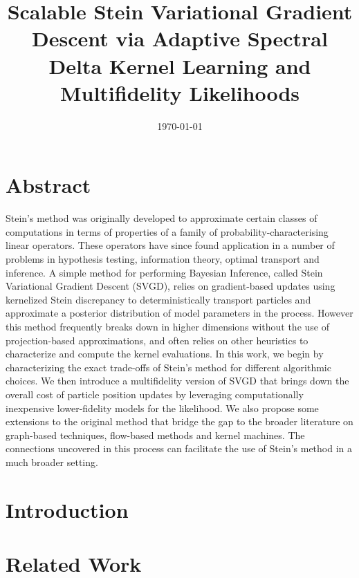 \documentclass[12pt]{article}
\title{Scalable Stein Variational Gradient Descent via Adaptive Spectral Delta Kernel Learning and Multifidelity Likelihoods}
\date{\today}
\renewcommand{\[}{\left[}
\renewcommand{\]}{\right]}
\renewcommand{\(}{\left(}
\renewcommand{\)}{\right)}
\begin{document}
\maketitle
\section*{Abstract}
Stein's method was originally developed to approximate certain classes of computations in terms of properties of a family of probability-characterising linear operators. 
These operators have since found application in a number of problems in hypothesis testing, information theory, optimal transport and inference. 
A simple method for performing Bayesian Inference, called Stein Variational Gradient Descent (SVGD), relies on gradient-based updates using kernelized Stein discrepancy to deterministically transport particles and approximate a posterior distribution of model parameters in the process. 
However this method frequently breaks down in higher dimensions without the use of projection-based approximations, and often relies on other heuristics to characterize and compute the kernel evaluations.
In this work, we begin by characterizing the exact trade-offs of Stein's method for different algorithmic choices. 
We then introduce a multifidelity version of SVGD that brings down the overall cost of particle position updates by leveraging computationally inexpensive lower-fidelity models for the likelihood.
We also propose some extensions to the original method that bridge the gap to the broader literature on graph-based techniques, flow-based methods and kernel machines. 
The connections uncovered in this process can facilitate the use of Stein's method in a much broader setting.



\section{Introduction}



\section{Related Work}
\end{document}
